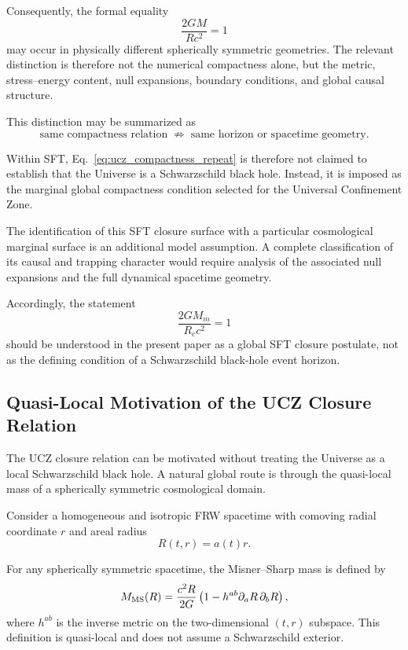 \documentclass[12pt]{article}
\begin{document}
Consequently, the formal equality
\[
\frac{2GM}{Rc^2}=1
\]
may occur in physically different spherically symmetric geometries.
The relevant distinction is therefore not the numerical compactness
alone, but the metric, stress--energy content, null expansions,
boundary conditions, and global causal structure.

This distinction may be summarized as
\begin{equation}
\boxed{
\text{same compactness relation}
\;\not\Rightarrow\;
\text{same horizon or spacetime geometry}.
}
\end{equation}

Within SFT, Eq.~\eqref{eq:ucz_compactness_repeat} is therefore not
claimed to establish that the Universe is a Schwarzschild black hole.
Instead, it is imposed as the marginal global compactness condition
selected for the Universal Confinement Zone.

The identification of this SFT closure surface with a particular
cosmological marginal surface is an additional model assumption. A
complete classification of its causal and trapping character would
require analysis of the associated null expansions and the full
dynamical spacetime geometry.

Accordingly, the statement
\begin{equation}
\frac{2GM_m}{R_c c^2}=1
\end{equation}
should be understood in the present paper as a global SFT closure
postulate, not as the defining condition of a Schwarzschild
black-hole event horizon.


\subsection{Quasi-Local Motivation of the UCZ Closure Relation}
\label{subsec:global_derivation_ucz}

The UCZ closure relation can be motivated without treating the Universe as a
local Schwarzschild black hole. A natural global route is through the
quasi-local mass of a spherically symmetric cosmological domain.

Consider a homogeneous and isotropic FRW spacetime with comoving
radial coordinate \(r\) and areal radius
\[
R(t,r)=a(t)r.
\]

For any spherically symmetric spacetime, the Misner--Sharp mass is defined by
\cite{MisnerSharp1964,Hayward1996}
\begin{equation}
M_{\rm MS}(R)
=
\frac{c^2R}{2G}
\left(
1-h^{ab}\partial_aR\,\partial_bR
\right),
\label{eq:MS_mass_def}
\end{equation}
where \(h^{ab}\) is the inverse metric on the two-dimensional
\((t,r)\) subspace. This definition is quasi-local and does not assume a
Schwarzschild exterior.
\end{document}
